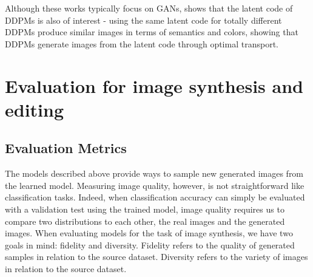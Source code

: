  Although 
these works typically focus on \ac{GAN}s, \cite{khrulkov2022understanding} shows that the latent code of 
\ac{DDPM}s is also of interest - using the same latent code for totally different 
\ac{DDPM}s produce similar images in terms of semantics and colors, showing that \ac{DDPM}s generate 
images from the latent code through optimal transport.






\section{Evaluation for image synthesis and editing}

\subsection{Evaluation Metrics}

The models described above provide ways to sample new generated images from the learned model. 
Measuring image quality, however, is not straightforward like classification tasks. Indeed, when 
classification accuracy can simply be evaluated with a validation test using the trained model, 
image quality requires us to compare two distributions to each other, the real images and the 
generated images. When evaluating models for the task of image synthesis, we have two goals in mind:
fidelity and diversity. Fidelity refers to the quality of generated samples in relation to the 
source dataset. Diversity refers to the variety of images in relation to the source 
dataset.


